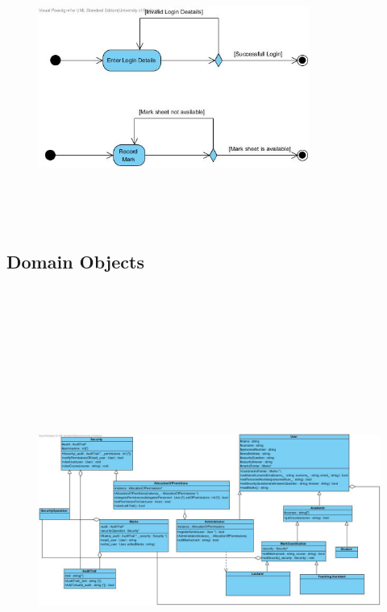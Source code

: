 \documentclass[12pt]{article}
\begin{document}
			\begin{figure}[http]
				\centering
				\includegraphics[width=3.5in, height=3.5in]{./UML/ProcessSpecifications.jpg}
			\end{figure}
		
		\newpage
		\vspace{0.2in}
		
		\subsection{Domain Objects}
		
			\vspace{0.2in}
			
			\begin{figure}[http]
				\centering
				\includegraphics[width=7in, height=6in]{./UML/DomainObjects.jpg}
			\end{figure}
	
\end{document}
